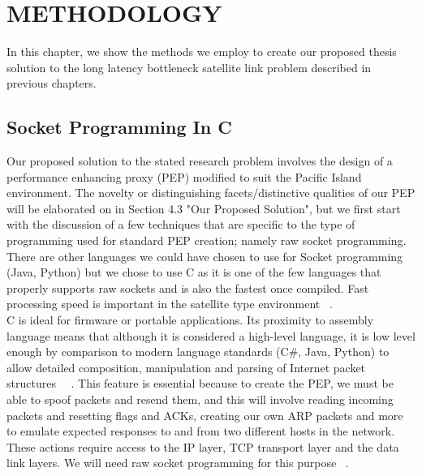
\chapter{METHODOLOGY}

In this chapter, we show the methods we employ to create our proposed thesis solution to the long latency bottleneck satellite link problem described in previous chapters. 

\section{Socket Programming In C}
Our proposed solution to the stated research problem involves the design of a performance enhancing proxy (PEP) modified to suit the Pacific Island environment. The novelty or distinguishing facets/distinctive qualities of our PEP will be elaborated on in Section 4.3 "Our Proposed Solution", but we first start with the discussion of a few techniques that are specific to the type of programming used for standard PEP creation; namely raw socket programming. There are other languages we could have chosen to use for Socket programming (Java, Python) but we chose to use C as it is one of the few languages that properly supports raw sockets and is also the fastest once compiled. Fast processing speed is important in the satellite type environment ~\cite{35}.\\

C is ideal for firmware or portable applications. Its proximity to assembly language means that although it is considered a high-level language,  it is low level enough by comparison to modern language standards (C\#, Java, Python) to allow detailed composition, manipulation and parsing of Internet packet structures ~\cite{35}~\cite{36}. This feature is essential because to create the PEP, we must be able to spoof packets and resend them, and this will involve reading incoming packets and resetting flags and ACKs, creating our own ARP packets and more to emulate expected responses to and from two different hosts in the network. These actions require access to the IP layer, TCP transport layer and the data link layers. We will need raw socket programming for this purpose ~\cite{38}. 

